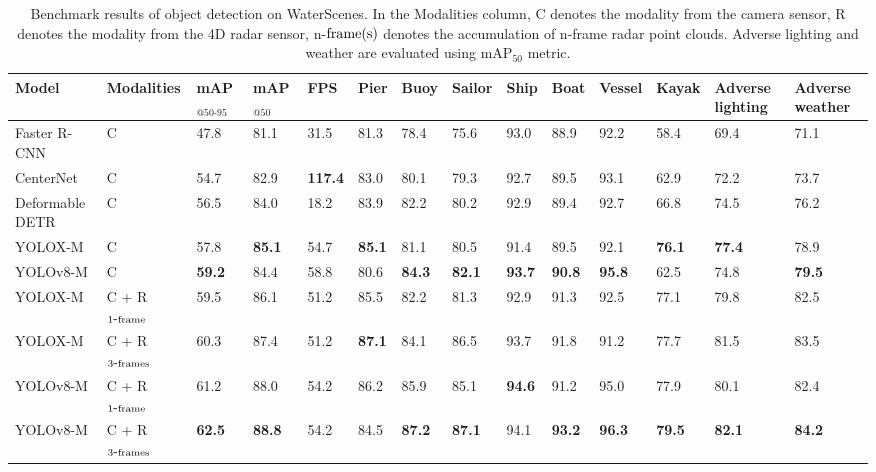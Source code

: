 \documentclass[lettersize,journal]{IEEEtran}
\begin{document}
\begin{table*}[!h]
\caption{Benchmark results of object detection on WaterScenes. In the Modalities column, C denotes the modality from the camera sensor, R denotes the modality from the 4D radar sensor, n-$\textup{frame(s)}$ denotes the accumulation of n-frame radar point clouds. Adverse lighting and weather are evaluated using mAP$_{50}$ metric.}
\center
\footnotesize
\begin{tabular*}{\linewidth}{
p{2.7cm}<{}
p{1.6cm}<{\centering}|
p{0.6cm}<{\centering}
p{0.6cm}<{\centering}
p{0.6cm}<{\centering}|
p{0.55cm}<{\centering}
p{0.6cm}<{\centering}
p{0.6cm}<{\centering}
p{0.6cm}<{\centering}
p{0.6cm}<{\centering}
p{0.6cm}<{\centering}
p{0.65cm}<{\centering}|
p{1cm}<{\centering}
p{0.9cm}<{\centering}}
\toprule
\bf{Model} & \bf{Modalities} & \bf{mAP $_{@50\text{-}95}$} & \bf{mAP $_{@50}$} & \bf{FPS} &  \textbf{Pier} & \textbf{Buoy} & \textbf{Sailor} & \textbf{Ship} & \textbf{Boat} & \textbf{Vessel} & \textbf{Kayak} & \bf{Adverse lighting} & \bf{Adverse weather}\\\midrule
Faster R-CNN \cite{girshick2015fast} & C & 47.8 & 81.1 & 31.5 & 81.3 & 78.4 & 75.6 & 93.0 & 88.9 & 92.2 & 58.4 & 69.4 & 71.1\\
CenterNet \cite{zhou2019objects} & C & 54.7 & 82.9 & \textbf{117.4} & 83.0 & 80.1 & 79.3 & 92.7 & 89.5 & 93.1 & 62.9 & 72.2 & 73.7\\
Deformable DETR \cite{zhu2020deformable}  & C & 56.5 & 84.0 & 18.2 & 83.9 & 82.2 & 80.2 & 92.9 & 89.4 & 92.7 & 66.8 & 74.5 & 76.2\\
YOLOX-M \cite{ge2021yolox} & C & 57.8 & \textbf{85.1} & 54.7 & \bf{85.1} & 81.1 & 80.5 & 91.4 & 89.5 & 92.1 & \bf{76.1} & \bf{77.4} & 78.9\\
YOLOv8-M \cite{yolov8} & C & \textbf{59.2} & 84.4 & 58.8 & 80.6 & \bf{84.3} & \bf{82.1} & \bf{93.7} & \bf{90.8} & \textbf{95.8} & 62.5 & 74.8 & \bf{79.5}\\
\midrule
YOLOX-M \cite{ge2021yolox} & C + R$_{1\mbox{-}\textup{frame}}$ & 59.5 & 86.1 & 51.2 & 85.5 & 82.2 & 81.3 & 92.9 & 91.3 & 92.5 & 77.1 & 79.8 & 82.5\\
YOLOX-M \cite{ge2021yolox} & C + R$_{3\mbox{-}\textup{frames}}$ & 60.3 & 87.4 & 51.2 & \textbf{87.1} & 84.1 & 86.5 & 93.7 & 91.8 & 91.2 & 77.7 & 81.5 & 83.5\\
YOLOv8-M \cite{yolov8} & C + R$_{1\mbox{-}\textup{frame}}$ & 61.2 & 88.0 & 54.2 & 86.2 & 85.9 & 85.1 & \textbf{94.6} & 91.2 & 95.0 & 77.9 & 80.1 & 82.4\\
YOLOv8-M \cite{yolov8} & C + R$_{3\mbox{-}\textup{frames}}$ & \textbf{62.5} & \textbf{88.8} & 54.2 & 84.5 & \textbf{87.2} & \textbf{87.1} & 94.1 & \textbf{93.2} & \bf{96.3} & \textbf{79.5} & \bf{82.1} & \bf{84.2}\\
\bottomrule
\end{tabular*}
\label{tab:object-detection-baselines}
\end{table*}
\end{document}

